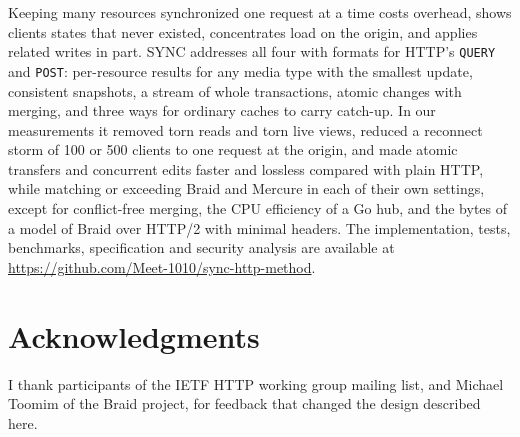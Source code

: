 \documentclass[11pt,a4paper]{article}
\begin{document}
Keeping many resources synchronized one request at a time costs overhead, shows clients states that never existed, concentrates load on the origin, and applies related writes in part. SYNC addresses all four with formats for HTTP's \texttt{QUERY} and \texttt{POST}: per-resource results for any media type with the smallest update, consistent snapshots, a stream of whole transactions, atomic changes with merging, and three ways for ordinary caches to carry catch-up. In our measurements it removed torn reads and torn live views, reduced a reconnect storm of 100 or 500 clients to one request at the origin, and made atomic transfers and concurrent edits faster and lossless compared with plain HTTP, while matching or exceeding Braid and Mercure in each of their own settings, except for conflict-free merging, the CPU efficiency of a Go hub, and the bytes of a model of Braid over HTTP/2 with minimal headers. The implementation, tests, benchmarks, specification and security analysis are available at \url{https://github.com/Meet-1010/sync-http-method}.

\section*{Acknowledgments}

I thank participants of the IETF HTTP working group mailing list, and Michael Toomim of the Braid project, for feedback that changed the design described here.
\end{document}
